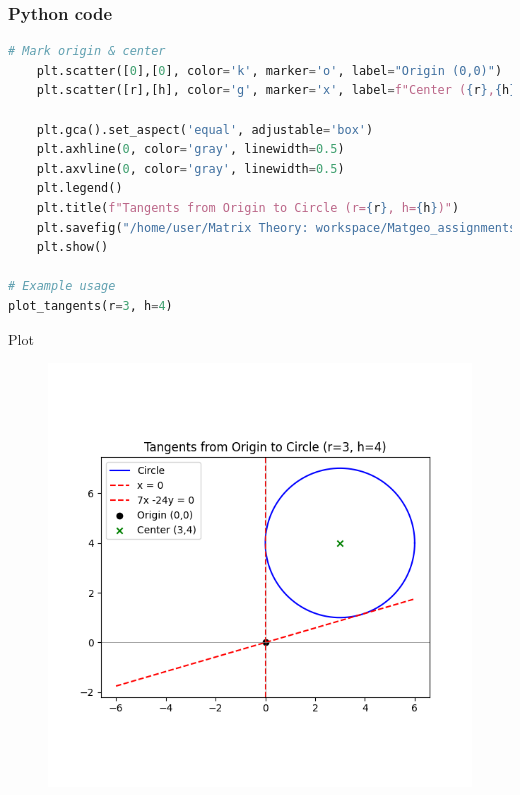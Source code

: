 \documentclass{beamer}
\begin{document}
\begin{frame}[fragile]
    \frametitle{Python code}
    \begin{lstlisting}[language=Python]
# Mark origin & center
    plt.scatter([0],[0], color='k', marker='o', label="Origin (0,0)")
    plt.scatter([r],[h], color='g', marker='x', label=f"Center ({r},{h})")

    plt.gca().set_aspect('equal', adjustable='box')
    plt.axhline(0, color='gray', linewidth=0.5)
    plt.axvline(0, color='gray', linewidth=0.5)
    plt.legend()
    plt.title(f"Tangents from Origin to Circle (r={r}, h={h})")
    plt.savefig("/home/user/Matrix Theory: workspace/Matgeo_assignments/10.7.75/figs/Figure_1.png")
    plt.show()

# Example usage
plot_tangents(r=3, h=4)
    \end{lstlisting}   
\end{frame}

\begin{frame}{Plot}
    \begin{figure}[H]
    \centering
    \includegraphics[width=0.6\columnwidth]{figs/Figure_1.png}
    \label{fig:1}
    \end{figure}
\end{frame}
\end{document}
